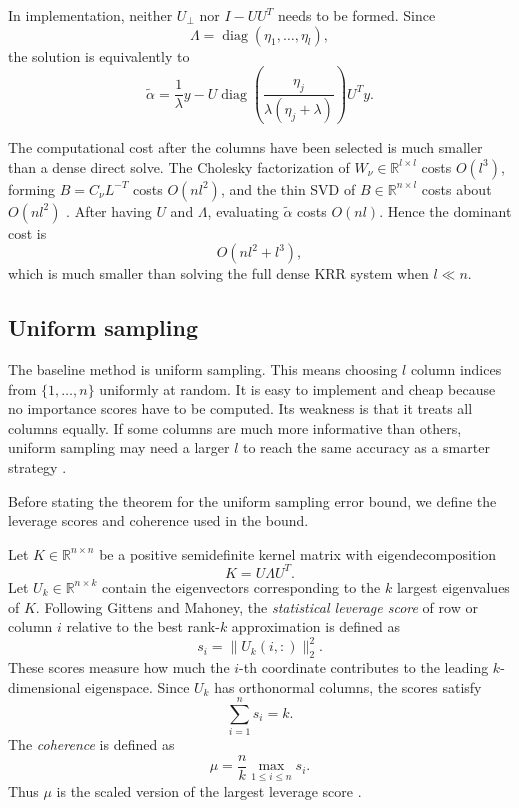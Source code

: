 In implementation, neither $U_\perp$ nor $I-UU^T$ needs to be formed. Since
\[
\Lambda=\operatorname{diag}(\eta_1,\ldots,\eta_l),
\]
the solution is equivalently to
\[
\tilde\alpha=\frac{1}{\lambda}y-U\operatorname{diag}\left(\frac{\eta_j}{\lambda(\eta_j+\lambda)}\right)U^Ty.
\]

The computational cost after the columns have been selected is much smaller than
a dense direct solve. The Cholesky factorization of $W_\nu\in\mathbb{R}^{l\times l}$ costs
$O(l^3)$, forming $B=C_\nu L^{-T}$ costs $O(nl^2)$, and the thin SVD of
$B\in\mathbb{R}^{n\times l}$ costs about $O(nl^2)$ \citep{trefethen1997numerical}. After having $U$ and $\Lambda$,
evaluating $\tilde\alpha$ costs $O(nl)$. Hence the dominant cost is
\[
O(nl^2+l^3),
\]
which is much smaller than solving the full dense KRR system when $l\ll n$.

\subsection{Uniform sampling}

The baseline method is uniform sampling. This means choosing $l$ column indices from $\{1,\ldots,n\}$ uniformly at random. It is easy to implement and cheap because no importance scores have to be computed. Its weakness is that it treats all columns equally. If some columns are much more informative than others, uniform sampling may need a larger $l$ to reach the same accuracy as a smarter strategy \citep{kumar2012sampling,gittens2016revisiting}.

Before stating the theorem for the uniform sampling error bound, we define the leverage scores and coherence used in the bound. 

Let $K\in\mathbb{R}^{n\times n}$ be a positive semidefinite kernel matrix with eigendecomposition
\[
K=U\Lambda U^T.
\]
Let $U_k\in\mathbb{R}^{n\times k}$ contain the eigenvectors corresponding to the $k$ largest eigenvalues of $K$. Following Gittens and Mahoney, the \emph{statistical leverage score} of row or column $i$ relative to the best rank-$k$ approximation is defined as
\[
s_i=\|U_k(i,:)\|_2^2.
\]
These scores measure how much the $i$-th coordinate contributes to the leading $k$-dimensional eigenspace. Since $U_k$ has orthonormal columns, the scores satisfy
\[
\sum_{i=1}^n s_i=k.
\]
The \emph{coherence} is defined as
\[
\mu=\frac{n}{k}\max_{1\leq i\leq n}s_i.
\]
Thus $\mu$ is the scaled version of the largest leverage score \citep{drineas2012fast,gittens2016revisiting}.

